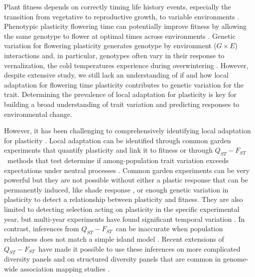 \documentclass[11pt,letterpaper]{article}
\newcommand{\gxe}{$G \times E$}
\newcommand{\qf}{$Q_{ST}-F_{ST}$}
\begin{document}
Plant fitness depends on correctly timing life history events, especially the transition from vegetative to reproductive growth, to variable environments \citep{worthy2025accelerated, aagren2017adaptive, colautti2013rapid}.
Phenotypic plasticity flowering time can potentially improve fitness by allowing the same genotype to flower at optimal times across environments \citep{blackman2017changing}.
Genetic variation for flowering plasticity generates genotype by environment (\gxe) interactions \citep{li2014genetic, li2010association} and, in particular, genotypes often vary in their response to vernalization, the cold temperatures experience during overwintering \citep{shindo2006variation, sung2005remembering}.
However, despite extensive study, we still lack an understanding of if and how local adaptation for flowering time plasticity contributes to genetic variation for the trait.
Determining the prevalence of local adaptation for plasticity is key for building a broad understanding of trait variation and predicting responses to environmental change.

However, it has been challenging to comprehensively identifying local adaptation for plasticity \citep{josephs2018determining}.
Local adaptation can be identified through common garden experiments that quantify plasticity and link it to fitness \citep{stinchcombe2004flowering, scheiner1999measuring, dudley1996testing, baythavong2010characterizing} or through \qf\ methods that test determine if among-population trait variation exceeds expectations under neutral processes \citep{prout1993f, spitze1993population, whitlock2008evolutionary, ovaskainen2011new, karhunen2013driftsel}.
Common garden experiments can be very powerful but they are not possible without either a plastic response that can be permanently induced, like shade response \citep{dudley1996testing}, or enough genetic variation in plasticity to detect a relationship between plasticity and fitness.
They are also limited to detecting selection acting on plasticity in the specific experimental year, but multi-year experiments have found significant temporal variation \citep{oakley2023ecological}.
In contrast, inferences from \qf\ can be inaccurate when population relatedness does not match a simple island model \citep{de2022common}.
Recent extensions of \qf\ have made it possible to use these inferences on more complicated diversity panels \citep{do2025method, ovaskainen2011new} and on structured diversity panels that are common in genome-wide association mapping studies \citep{Josephs2019}.
\end{document}

